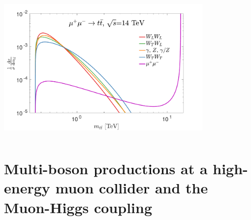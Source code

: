 \documentclass[aspectratio=169]{beamer}
\begin{document}
\begin{frame}
\begin{columns}
\begin{column}{0.42\textwidth}
			\includegraphics[width=0.8\textwidth]{figs/tt_dmtt.pdf}
		\end{column}
	\end{columns}   
\end{frame}

\section[Multi-boson productions and Muon Yukawa]{Multi-boson productions at a high-energy muon collider and the Muon-Higgs coupling} 
\end{document}
